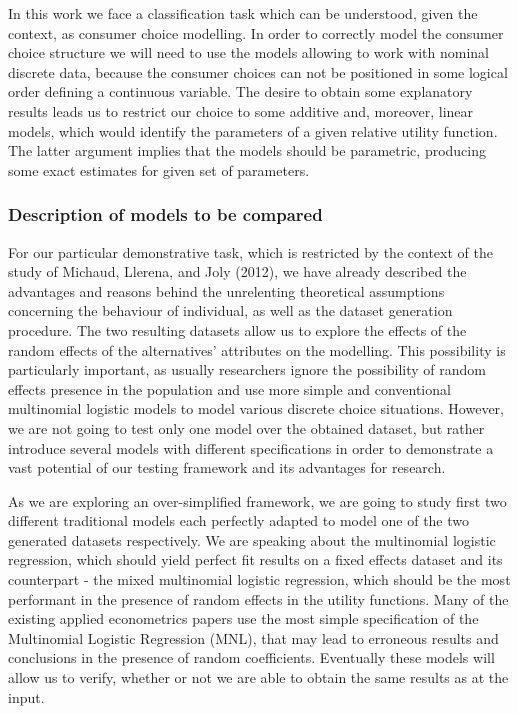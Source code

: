 \documentclass[12pt,]{article}
\begin{document}
In this work we face a classification task which can be understood,
given the context, as consumer choice modelling. In order to correctly
model the consumer choice structure we will need to use the models
allowing to work with nominal discrete data, because the consumer
choices can not be positioned in some logical order defining a
continuous variable. The desire to obtain some explanatory results leads
us to restrict our choice to some additive and, moreover, linear models,
which would identify the parameters of a given relative utility
function. The latter argument implies that the models should be
parametric, producing some exact estimates for given set of parameters.

\hypertarget{description-of-models-to-be-compared}{%
\subsubsection{Description of models to be
compared}\label{description-of-models-to-be-compared}}

For our particular demonstrative task, which is restricted by the
context of the study of Michaud, Llerena, and Joly (2012), we have
already described the advantages and reasons behind the unrelenting
theoretical assumptions concerning the behaviour of individual, as well
as the dataset generation procedure. The two resulting datasets allow us
to explore the effects of the random effects of the alternatives'
attributes on the modelling. This possibility is particularly important,
as usually researchers ignore the possibility of random effects presence
in the population and use more simple and conventional multinomial
logistic models to model various discrete choice situations. However, we
are not going to test only one model over the obtained dataset, but
rather introduce several models with different specifications in order
to demonstrate a vast potential of our testing framework and its
advantages for research.

As we are exploring an over-simplified framework, we are going to study
first two different traditional models each perfectly adapted to model
one of the two generated datasets respectively. We are speaking about
the multinomial logistic regression, which should yield perfect fit
results on a fixed effects dataset and its counterpart - the mixed
multinomial logistic regression, which should be the most performant in
the presence of random effects in the utility functions. Many of the
existing applied econometrics papers use the most simple specification
of the Multinomial Logistic Regression (MNL), that may lead to erroneous
results and conclusions in the presence of random coefficients.
Eventually these models will allow us to verify, whether or not we are
able to obtain the same results as at the input.
\end{document}
